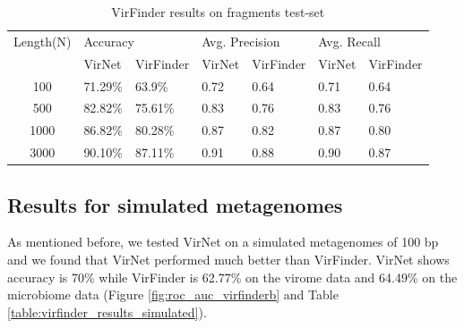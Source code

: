 \documentclass[conference]{IEEEtran}
\begin{document}
\begin{table}[h!]
	\centering
	\begin{tabular}{||c l l l l l l||} 
		Length(N) &	\multicolumn{2}{l}{Accuracy} & \multicolumn{2}{l}{Avg. Precision} & \multicolumn{2}{l}{Avg. Recall}\\ [0.5ex] 
		& VirNet & VirFinder & VirNet & VirFinder & VirNet & VirFinder \\
		\hline\hline
		100 & 71.29\% &	63.9\%	& 0.72 & 0.64 & 0.71 & 0.64 \\
		500 & 82.82\% &	75.61\% & 0.83 &	0.76 & 0.83 & 0.76\\
		1000 & 86.82\% &	80.28\% &  0.87 & 0.82 & 0.87 & 0.80 \\
		3000 & 90.10\% &	87.11\% & 0.91 & 0.88 & 0.90 & 0.87 \\[1ex]
	\end{tabular}
	\caption{VirFinder results on fragments test-set}
	\label{table:virfinder_results}
\end{table}

\subsection{Results for simulated metagenomes}

As mentioned before, we tested VirNet on a simulated metagenomes of 100 bp and we found that VirNet performed much better than VirFinder. VirNet shows accuracy is 70\% while VirFinder is 62.77\% on the virome data and 64.49\% on the microbiome data (Figure \ref{fig:roc_auc_virfinderb} and Table \ref{table:virfinder_results_simulated}).
\end{document}
